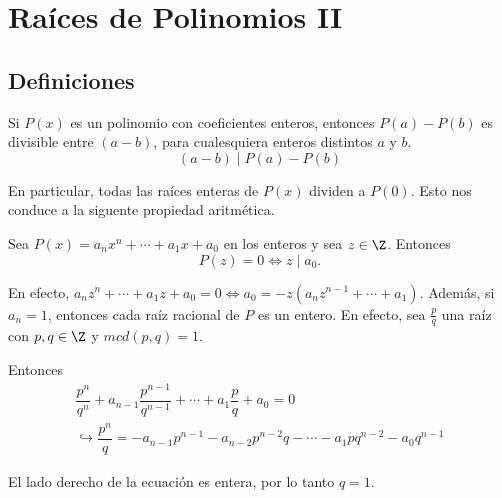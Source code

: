 \newpage
\section{Raíces de Polinomios II}


\subsection{Definiciones}

\begin{section-theorem.tcb}\label{divibility-polynomial-theorem}
    Si $P(x)$ es un polinomio con coeficientes enteros, entonces $P(a) - P(b)$ es divisible entre $(a - b)$, para cualesquiera enteros distintos $a$ y $b$.
    \[(a - b) \mid P(a) - P(b)\]
\end{section-theorem.tcb}

En particular, todas las raíces enteras de $P(x)$ dividen a $P(0)$.
Esto nos conduce a la siguente propiedad aritmética.

\begin{section-definition.tcb}
    Sea $P(x) = a_n x^n + \cdots + a_1 x + a_0$ en los enteros y sea $z \in \Z$.
    Entonces \[P(z) = 0 \Leftrightarrow z \mid a_0.\]
\end{section-definition.tcb}

En efecto, $a_n z^n + \cdots + a_1 z + a_0 = 0 \Leftrightarrow a_0 = -z(a_n z^{n - 1} + \cdots + a_1)$.
Además, si $a_n = 1$, entonces cada raíz racional de $P$ es un entero.
En efecto, sea $\frac{p}{q}$ una raíz con $p, q \in \Z$ y $mcd(p, q) = 1$.

Entonces
\begin{gather*}
    \dfrac{p^n}{q^n} + a_{n - 1} \dfrac{p^{n - 1}}{q^{n - 1}} + \cdots + a_1 \dfrac{p}{q} + a_0  = 0 \\
    \hookrightarrow \dfrac{p^n}{q} = - a_{n - 1} p^{n - 1} - a_{n - 2} p^{n - 2} q - \cdots - a_1 p q^{n - 2} - a_0 q^{n - 1}
\end{gather*}

El lado derecho de la ecuación es entera, por lo tanto $q = 1$.

